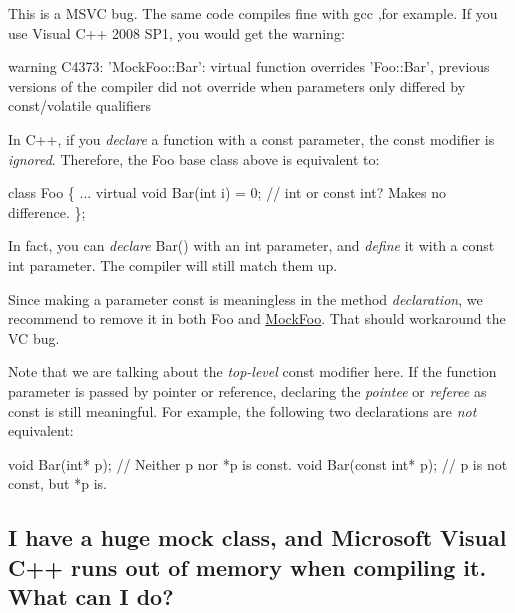 This is a M\+S\+VC bug. The same code compiles fine with gcc ,for example. If you use Visual C++ 2008 S\+P1, you would get the warning\+: 
\begin{DoxyCode}
warning C4373: 'MockFoo::Bar': virtual function overrides 'Foo::Bar', previous versions of the compiler did
       not override when parameters only differed by const/volatile qualifiers
\end{DoxyCode}


In C++, if you {\itshape declare} a function with a {\ttfamily const} parameter, the {\ttfamily const} modifier is {\itshape ignored}. Therefore, the {\ttfamily Foo} base class above is equivalent to\+: 
\begin{DoxyCode}
\textcolor{keyword}{class }Foo \{
  ...
  \textcolor{keyword}{virtual} \textcolor{keywordtype}{void} Bar(\textcolor{keywordtype}{int} i) = 0;  \textcolor{comment}{// int or const int?  Makes no difference.}
\};
\end{DoxyCode}


In fact, you can {\itshape declare} Bar() with an {\ttfamily int} parameter, and {\itshape define} it with a {\ttfamily const int} parameter. The compiler will still match them up.

Since making a parameter {\ttfamily const} is meaningless in the method {\itshape declaration}, we recommend to remove it in both {\ttfamily Foo} and {\ttfamily \hyperlink{classMockFoo}{Mock\+Foo}}. That should workaround the VC bug.

Note that we are talking about the {\itshape top-\/level} {\ttfamily const} modifier here. If the function parameter is passed by pointer or reference, declaring the {\itshape pointee} or {\itshape referee} as {\ttfamily const} is still meaningful. For example, the following two declarations are {\itshape not} equivalent\+: 
\begin{DoxyCode}
\textcolor{keywordtype}{void} Bar(\textcolor{keywordtype}{int}* p);        \textcolor{comment}{// Neither p nor *p is const.}
\textcolor{keywordtype}{void} Bar(\textcolor{keyword}{const} \textcolor{keywordtype}{int}* p);  \textcolor{comment}{// p is not const, but *p is.}
\end{DoxyCode}


\subsection*{I have a huge mock class, and Microsoft Visual C++ runs out of memory when compiling it. What can I do?}

